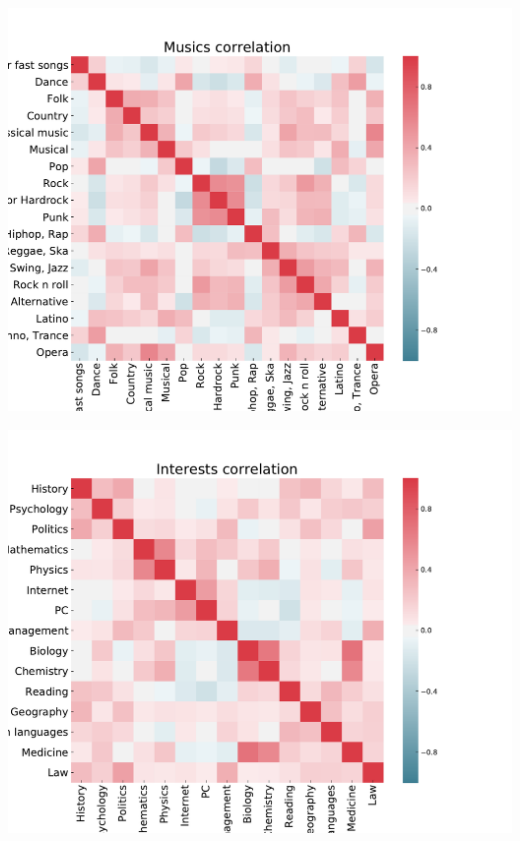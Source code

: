 \documentclass[russian, 10pt]{beamer}
\begin{document}
\begin{frame}

\centering
\includegraphics[scale=0.45]{images/3.pdf}

\end{frame}

\begin{frame}

\centering
\includegraphics[scale=0.45]{images/4.pdf}

\end{frame}
\end{document}
